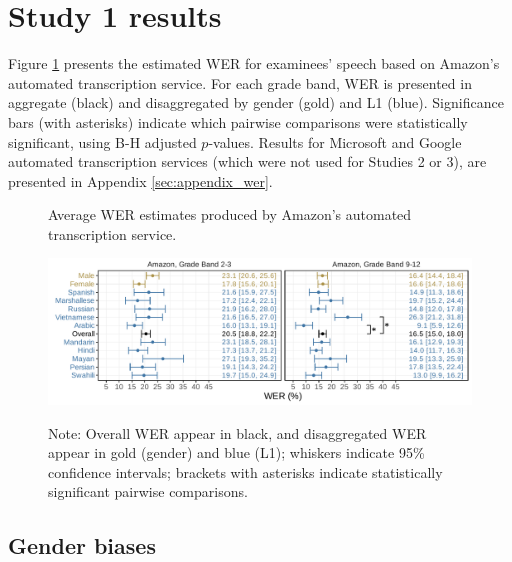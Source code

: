\documentclass [PhD] {uclathes}
\begin{document}
\section{Study 1 results}

Figure \ref{wer_aws} presents the estimated WER for examinees' speech based on Amazon’s automated transcription service. For each grade band, WER is presented in aggregate (black) and disaggregated by gender (gold) and L1 (blue). Significance bars (with asterisks) indicate which pairwise comparisons were statistically significant, using B-H adjusted $p$-values. Results for Microsoft and Google automated transcription services (which were not used for Studies 2 or 3), are presented in Appendix \ref{sec:appendix_wer}. 

\begin{figure}[h]
    \centering
    \caption{Average WER estimates produced by Amazon’s automated transcription service.}
    \includegraphics[width=6.5in]{figures/20230513_adj_werPlot_sigBars_aws.pdf}
    \label{wer_aws}
\caption*{\small Note: Overall WER appear in black, and disaggregated WER appear in gold (gender) and blue (L1); whiskers indicate 95\% confidence intervals; brackets with asterisks indicate statistically significant pairwise comparisons.}
\end{figure}

\subsection{Gender biases}
\end{document}
